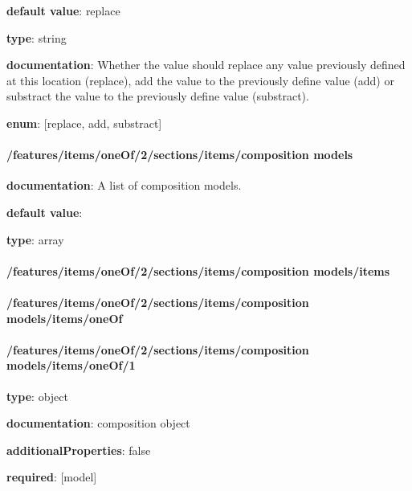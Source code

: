 \begin{itemized}
\item {\bf default value}: replace
\item {\bf type}: string
\item {\bf documentation}: Whether the value should replace any value previously defined at this location (replace), add the value to the previously define value (add) or substract the value to the previously define value (substract).
\item {\bf enum}: [replace, add, substract]\end{itemized}\paragraph{/features/items/oneOf/2/sections/items/composition models} \begin{itemized}
\item {\bf documentation}: A list of composition models.
\item {\bf default value}: 
\item {\bf type}: array
\paragraph{/features/items/oneOf/2/sections/items/composition models/items} \begin{itemized}
\end{itemized}\end{itemized}\paragraph{/features/items/oneOf/2/sections/items/composition models/items/oneOf} \begin{itemized}
\end{itemized}\paragraph{/features/items/oneOf/2/sections/items/composition models/items/oneOf/1} \begin{itemized}
\item {\bf type}: object
\item {\bf documentation}: composition object
\item {\bf additionalProperties}: false
\item {\bf required}: [model]\end{itemized}
